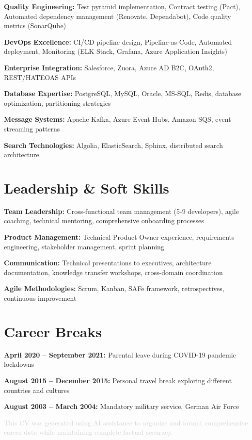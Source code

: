\documentclass[11pt,a4paper]{article}
\begin{document}
\textbf{Quality Engineering:} Test pyramid implementation, Contract testing (Pact), Automated dependency management (Renovate, Dependabot), Code quality metrics (SonarQube)

\textbf{DevOps Excellence:} CI/CD pipeline design, Pipeline-as-Code, Automated deployment, Monitoring (ELK Stack, Grafana, Azure Application Insights)

\textbf{Enterprise Integration:} Salesforce, Zuora, Azure AD B2C, OAuth2, REST/HATEOAS APIs

\textbf{Database Expertise:} PostgreSQL, MySQL, Oracle, MS-SQL, Redis, database optimization, partitioning strategies

\textbf{Message Systems:} Apache Kafka, Azure Event Hubs, Amazon SQS, event streaming patterns

\textbf{Search Technologies:} Algolia, ElasticSearch, Sphinx, distributed search architecture

\section{Leadership \& Soft Skills}

\textbf{Team Leadership:} Cross-functional team management (5-9 developers), agile coaching, technical mentoring, comprehensive onboarding processes

\textbf{Product Management:} Technical Product Owner experience, requirements engineering, stakeholder management, sprint planning

\textbf{Communication:} Technical presentations to executives, architecture documentation, knowledge transfer workshops, cross-domain coordination

\textbf{Agile Methodologies:} Scrum, Kanban, SAFe framework, retrospectives, continuous improvement

\section{Career Breaks}

\textbf{April 2020 -- September 2021:} Parental leave during COVID-19 pandemic lockdowns

\textbf{August 2015 -- December 2015:} Personal travel break exploring different countries and cultures

\textbf{August 2003 -- March 2004:} Mandatory military service, German Air Force

\vfill

\begin{center}
\textcolor{lightgray}{\footnotesize This CV was generated using AI assistance to organize and format comprehensive career data while maintaining complete factual accuracy.}
\end{center}
\end{document}

